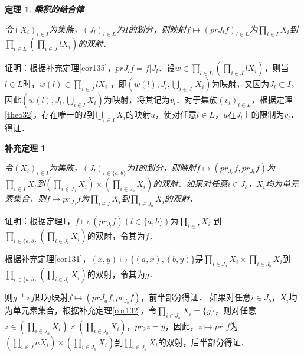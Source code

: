 \documentclass[12pt, a4paper, oneside]{book}
\newtheorem{theo}{定理}
\newtheorem{cor}{补充定理}
\begin{document}
			\begin{theo}\label{theo46}
				\textbf{乘积的结合律}
				\par
				令$(X_i)_{i\in I}$为集族，$(J_l)_{l\in L}$为$I$的划分，则映射$f\mapsto (prJ_lf)_{l\in L}$为$\prod\limits_{i\in I}X_i$到$\prod\limits_{l\in L}(\prod\limits_{i\in J}lX_i)$的双射．
			\end{theo}
			证明：根据补充定理\ref{cor135}，$prJ_lf=f|J_l$．设$w\in \prod\limits_{l\in L}(\prod\limits_{i\in J}lX_i )$，则当$l\in L$时，$w(l)\in \prod\limits_{i\in J}lX_i$ ，即$(w(l), J_l, \bigcup\limits_{i\in J_l}X_i)$为映射，又因为$J_l\subset I$，因此$(w(l), J_l, \bigcup\limits_{i\in I}X_i)$为映射，将其记为$v_l$．对于集族$(v_l)_{l\in L}$，根据定理\ref{theo32}，存在唯一的$I$到$\bigcup\limits_{i\in I}X_i$的映射$u$，使对任意$l\in L$，$u$在$J_l$上的限制为$v_l$．得证．
			
			\begin{cor}\label{cor138}
				\hfill\par
				令$(X_i)_{i\in I}$为集族，$(J_l)_{l\in \{a, b\}}$为$I$的划分，则映射$f\mapsto (pr_{J_a}f, pr_{J_b}f)$为$\prod\limits_{i\in I}X_i$到$(\prod\limits_{i\in J_a}X_i)\times (\prod\limits_{i\in J_b}X_i)$的双射．如果对任意$i\in J_b$，$X_i$均为单元素集合，则$f\mapsto pr_{J_a}f$为$\prod\limits_{i\in I}X_i$到$\prod\limits_{i\in J_a}X_i$的双射．
			\end{cor}
			证明：根据定理\ref{theo46}，$f\mapsto (pr_{J_l}f)(l\in \{a, b\})$为$\prod\limits_{i\in I}X_i$ 到$\prod\limits_{l\in \{a, b\}}(\prod\limits_{i\in J_l}X_i)$的双射，令其为$f$．
			\par
			根据补充定理\ref{cor131}，$(x, y)\mapsto \{(a, x), (b, y)\}$是$\prod\limits_{i\in J_a}X_i\times \prod\limits_{i\in J_b}X_i$到$\prod\limits_{l\in \{a, b\}}(\prod\limits_{i\in J_l}X_i)$的双射，令其为$g$．
			\par
			则$g^{-1}\circ f$即为映射$f\mapsto (pr{J_a}f, pr_{J_b}f)$，前半部分得证．
			如果对任意$i\in J_b$，$X_i$均为单元素集合，根据补充定理\ref{cor132}，令$\prod\limits_{i\in J_b}X_i=\{y\}$，则对任意$z\in (\prod\limits_{i\in J_a}X_i)\times (\prod\limits_{i\in J_b}X_i)$，$pr_2z=y$，因此，$z\mapsto pr_1f$为$(\prod\limits_{i\in J}aX_i)\times (\prod\limits_{i\in J_b}X_i)$到$\prod\limits_{i\in J_a}X_i$的双射，后半部分得证．
			
\end{document}
